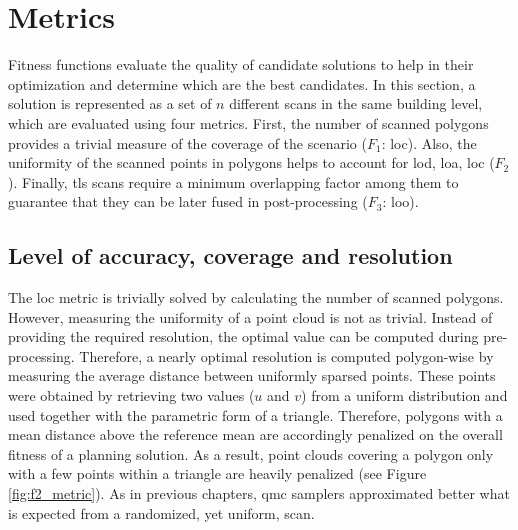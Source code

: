 \section{Metrics}

Fitness functions evaluate the quality of candidate solutions to help in their optimization and determine which are the best candidates. In this section, a solution is represented as a set of $n$ different scans in the same building level, which are evaluated using four metrics. First, the number of scanned polygons provides a trivial measure of the coverage of the scenario ($F_1$: \acrshort{loc}). Also, the uniformity of the scanned points in polygons helps to account for  \acrshort{lod}, \acrshort{loa}, \acrshort{loc} ($F_2$). Finally, \acrshort{tls} scans require a minimum overlapping factor among them to guarantee that they can be later fused in post-processing ($F_3$: \acrshort{loo}). 

\subsection{Level of accuracy, coverage and resolution}

The \acrshort{loc} metric is trivially solved by calculating the number of scanned polygons. However, measuring the uniformity of a point cloud is not as trivial. Instead of providing the required resolution, the optimal value can be computed during pre-processing. Therefore, a nearly optimal resolution is computed polygon-wise by measuring the average distance between uniformly sparsed points. These points were obtained by retrieving two values ($u$ and $v$) from a uniform distribution and used together with the parametric form of a triangle. Therefore, polygons with a mean distance above the reference mean are accordingly penalized on the overall fitness of a planning solution. As a result, point clouds covering a polygon only with a few points within a triangle are heavily penalized (see Figure \ref{fig:f2_metric}). As in previous chapters, \acrshort{qmc} samplers approximated better what is expected from a randomized, yet uniform, scan. 


